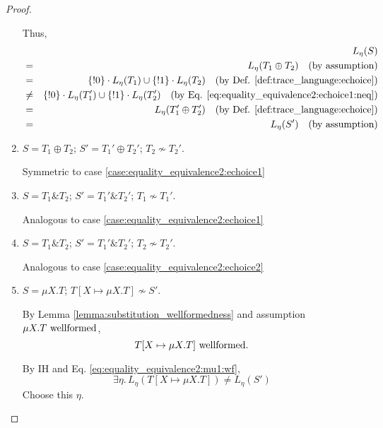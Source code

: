 \documentclass{llncs}
\newcommand*{\nsequiv}{\not\sim}
\newcommand*{\union}{\cup}
\newcommand*{\send}{\mathord{!}}
\newcommand*{\echoice}{\oplus}
\newcommand*{\ichoice}{\mathop{\&}}
\newcommand*{\concat}{\cdot}
\newcommand*{\wf}[1]{\text{$#1$ {\normalfont \rmfamily wellformed}}}
\renewcommand*{\|}{\;|\;}
\begin{document}
\begin{proof}
\begin{enumerate}
      Thus,
      \begin{eqnarray*}
        &&     L_\eta(S) \\
        &=&    L_\eta(T_1 \echoice T_2)
               \quad \text{(by assumption)} \\
        &=&    \{\send 0\} \concat L_\eta(T_1) \union \{\send 1\} \concat L_\eta(T_2)
               \quad \text{(by Def. \ref{def:trace_language:echoice})} \\
        &\neq& \{\send 0\} \concat L_\eta(T_1') \union \{\send 1\} \concat L_\eta(T_2')
               \quad \text{(by Eq. \ref{eq:equality_equivalence2:echoice1:neq})} \\
        &=&    L_\eta(T_1' \echoice T_2')
               \quad \text{(by Def. \ref{def:trace_language:echoice})} \\
        &=&    L_\eta(S')
               \quad \text{(by assumption)}
      \end{eqnarray*}

    \item
      \label{case:equality_equivalence2:echoice2}
      $S = T_1 \echoice T_2$; $S' = T_1' \echoice T_2'$; $T_2 \nsequiv T_2'$.

      Symmetric to case \ref{case:equality_equivalence2:echoice1}

    \item
      \label{case:equality_equivalence2:ichoice1}
      $S = T_1 \ichoice T_2$; $S' = T_1' \ichoice T_2'$; $T_1 \nsequiv T_1'$.

      Analogous to case \ref{case:equality_equivalence2:echoice1}

    \item
      \label{case:equality_equivalence2:ichoice2}
      $S = T_1 \ichoice T_2$; $S' = T_1' \ichoice T_2'$; $T_2 \nsequiv T_2'$.

      Analogous to case \ref{case:equality_equivalence2:echoice2}

    \item
      \label{case:equality_equivalence2:mu1}
      $S = \mu X.T$; $T[X \mapsto \mu X.T] \nsequiv S'$.

      By Lemma \ref{lemma:substitution_wellformedness} and assumption
      $\wf{\mu X.T}$,
      \begin{equation}
        \label{eq:equality_equivalence2:mu1:wf}
        \wf{T[X \mapsto \mu X.T]}.
      \end{equation}

      By IH and Eq. \ref{eq:equality_equivalence2:mu1:wf},
      \begin{equation}
        \label{eq:equality_equivalence2:mu1:neq}
        \exists \eta.\, L_\eta(T[X \mapsto \mu X.T]) \neq L_\eta(S')
      \end{equation}
      Choose this $\eta$.


\end{enumerate}
\end{proof}
\end{document}
